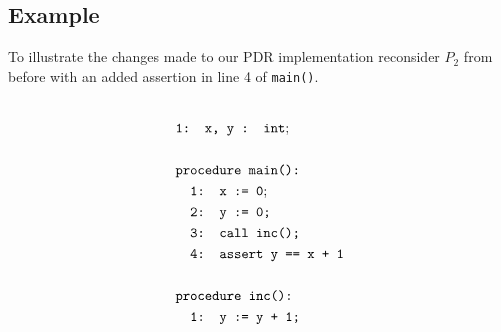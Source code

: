 \documentclass{article}
\begin{document}
	
	\subsection{Example}
	To illustrate the changes made to our PDR implementation reconsider $P_2$ from before with an added assertion in line 4 of \texttt{main()}.\\
	\pagestyle{plain} \\
	
	
	\pagebreak
	\pagestyle{empty}
	\begin{minipage}{.3\textwidth}
		\centering
		\begin{align*}
		&\texttt{1: x, y : int}; \\ \\
		&\texttt{procedure main():} \\
		&\texttt{\hspace*{1em}1:  x := 0}; \\
		&\texttt{\hspace*{1em}2:  y := 0;} \\
		&\texttt{\hspace*{1em}3: call inc();} \\
		&\texttt{\hspace*{1em}4: assert y == x + 1} \\ \\
		&\texttt{procedure inc():} \\
		&\texttt{\hspace*{1em}1: y := y\ +\ 1;} \\
		\end{align*}
		
		\label{fig:square}
	\end{minipage}%
	\hfill
\end{document}
